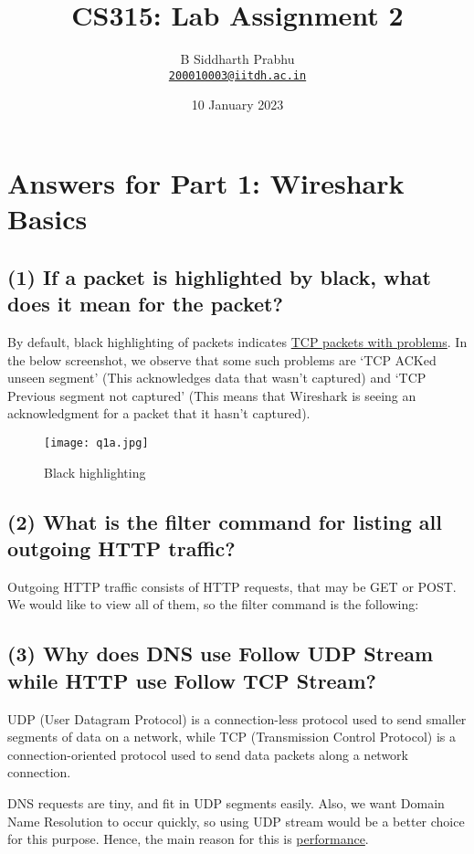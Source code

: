 \documentclass{article}
\title{CS315: Lab Assignment 2}
\author{
  B Siddharth Prabhu\\
  \href{mailto:200010003@iitdh.ac.in}{\texttt{200010003@iitdh.ac.in}}
  }
\date{10 January 2023}
\begin{document}
\maketitle

\section{Answers for Part 1: Wireshark Basics}

\subsection*{(1) If a packet is highlighted by black, what does it mean for the packet?}
By default, black highlighting of packets indicates \underline{TCP packets with problems}. In the below screenshot, we observe that some such problems are `TCP ACKed unseen segment' (This acknowledges data that wasn't captured) and `TCP Previous segment not captured' (This means that Wireshark is seeing an acknowledgment for a packet that it hasn't captured).

\begin{figure}[!hbt]
    \centering
    \texttt{[image: q1a.jpg]}
    \caption{Black highlighting}
    \label{fig:my_label1}
\end{figure}

\subsection*{(2) What is the filter command for listing all outgoing HTTP traffic?}
Outgoing HTTP traffic consists of HTTP requests, that may be GET or POST. We would like to view all of them, so the filter command is the following:\\ \vspace{2mm}


\subsection*{(3) Why does DNS use Follow UDP Stream while HTTP use Follow TCP Stream?}
UDP (User Datagram Protocol) is a connection-less protocol used to send smaller segments of data on a network, while TCP (Transmission Control Protocol) is a connection-oriented protocol used to send data packets along a network connection.

DNS requests are tiny, and fit in UDP segments easily. Also, we want Domain Name Resolution to occur quickly, so using UDP stream would be a better choice for this purpose. Hence, the main reason for this is \underline{performance}.
\end{document}
